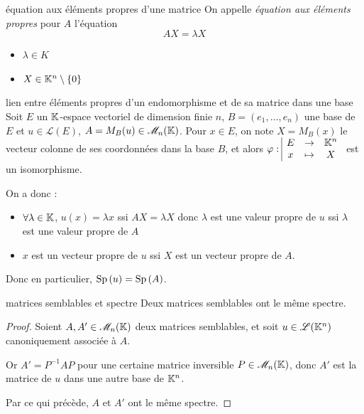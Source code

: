 \begin{definition}{équation aux éléments propres d'une matrice}{}
    On appelle \emph{équation aux éléments propres} pour $A$ l'équation 
    $$AX = \lambda X$$

    \begin{itemize}
        \item $\lambda \in K$
        \item $X \in \mathbb{K}^n \setminus \{0\}$
    \end{itemize}
    
\end{definition}

\begin{propositionnt}{lien entre éléments propres d'un endomorphisme et de sa matrice dans une base}{}
    Soit $E$ un $\mathbb{K}$-espace vectoriel de dimension finie $n$, 
    $B = (e_1, \ldots, e_n)$ une base de $E$ et $u \in \mathscr L(E)$, 
    $A = M_B(u) \in \mathscr M_n(\mathbb{K})$. 
    Pour $x \in E$, on note $X = M_B(x)$ le vecteur colonne de ses coordonnées dans la base $B$, et alors 
    $\varphi: \space \begin{array}{|ccc} \displaystyle E & \to & \displaystyle \mathbb{K}^n \\ \displaystyle x & \mapsto & \displaystyle X \end{array}$ est un isomorphisme. 
    
    On a donc : 
    \begin{itemize}
        \item $\forall \lambda \in \mathbb{K}$, $u(x) = \lambda x$ ssi $AX = \lambda X$ donc $\lambda$ est une valeur propre de $u$
        ssi $\lambda$ est une valeur propre de $A$
        \item $x$ est un vecteur propre de $u$
        ssi $X$ est un vecteur propre de $A$.
    \end{itemize}
    Donc en particulier, $\operatorname{Sp} \,(u) = \operatorname{Sp} \,(A)$.
\end{propositionnt}


\begin{proposition}{matrices semblables et spectre}{}
    Deux matrices semblables ont le même spectre.
\end{proposition}


\begin{proof}
    Soient $A, A' \in \mathscr M_n(\mathbb{K})$ deux matrices semblables, et 
    soit $u \in \mathscr L(\mathbb{K}^n)$ canoniquement associée à $A$. 

    Or $A' = P^{-1} A P$ pour une certaine matrice inversible $P \in \mathscr M_n(\mathbb{K})$, 
    donc $A'$ est la matrice de $u$ dans une autre base de $\mathbb{K}^n$.

    Par ce qui précède, $A$ et $A'$ ont le même spectre.
\end{proof}

